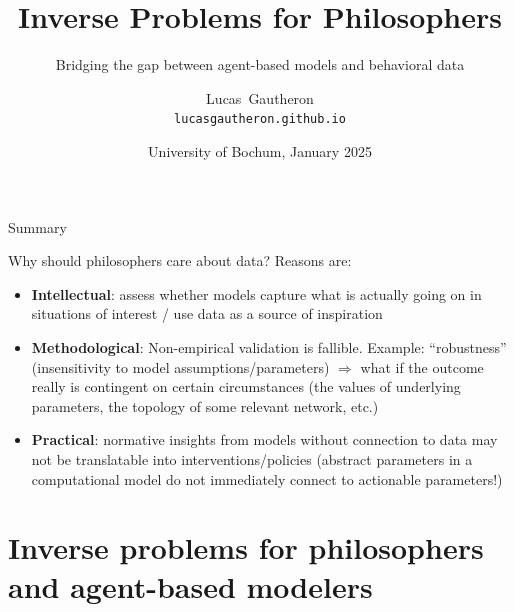 \documentclass[10pt]{beamer}
\title[Inverse Problems for Philosophers] %
{
Inverse Problems for Philosophers
}
\subtitle{Bridging the gap between agent-based models and behavioral data}
\author[L.~Gautheron]
{Lucas~Gautheron
\\\texttt{lucasgautheron.github.io}
}
\institute[IZWT, ENS] %
{
  Interdisciplinary Center for Science and Technology Studies, Wuppertal\\
  École Normale Supérieure, Paris
}
\date[24/01/2025] %
{\vspace{1em}University of Bochum, January 2025}
\begin{document}
\frame{
\titlepage
}

\begin{frame}{Summary}
    \tableofcontents
\end{frame}

\begin{frame}{Why should philosophers care about data?}
Reasons are:
    \begin{itemize}
        \item<1-> \textbf{Intellectual}: assess whether models capture what is actually going on in situations of interest / use data as a source of inspiration
        \item<2-> \textbf{Methodological}: Non-empirical validation is fallible. Example: ``robustness'' (insensitivity to model assumptions/parameters) $\Rightarrow$ what if the outcome really is contingent on certain circumstances (the values of underlying parameters, the topology of some relevant network, etc.)
        \item<3-> \textbf{Practical}: normative insights from models without connection to data may not be translatable into interventions/policies (abstract parameters in a computational model do not immediately connect to actionable parameters!)
    \end{itemize}
\end{frame}




\section{Inverse problems for philosophers and agent-based modelers}
\end{document}
